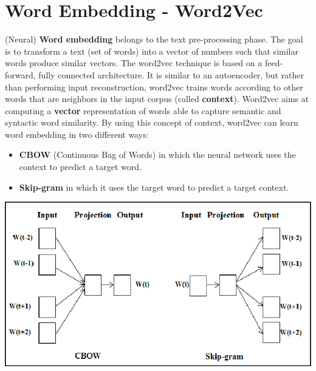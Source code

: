 \section{Word Embedding - Word2Vec}
(Neural) \textbf{Word embedding} belongs to the text pre-processing phase. The goal is to transform a text (set of words) into a vector of numbers such that similar words produce similar vectors. The word2vec technique is based on a feed-forward, fully connected architecture. It is similar to an autoencoder, but rather than performing input reconstruction, word2vec trains words according to other words that are neighbors in the input corpus (called \textbf{context}).\newline\newline
Word2vec aims at computing a \textbf{vector} representation of words able to capture semantic and syntactic word similarity.\newline\newline
By using this concept of context, word2vec can learn word embedding in two different ways:
\begin{itemize}
    \item \textbf{CBOW} (Continuous Bag of Words) in which the neural network uses the context to predict a target word.

    \item \textbf{Skip-gram} in which it uses the target word to predict a target context.
\end{itemize}
\begin{center}
    \includegraphics[scale = 0.3]{images/word2vec.png}
\end{center}
